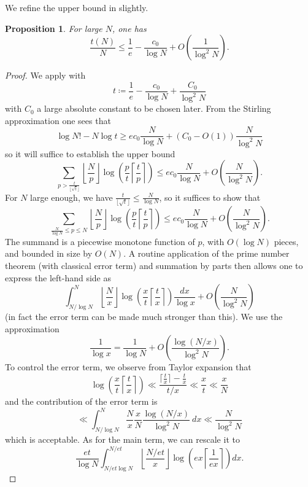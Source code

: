 \documentclass[12pt,a4paper,reqno]{amsart}
\numberwithin{equation}{section}
\theoremstyle{plain}
\newtheorem{proposition}[theorem]{Proposition}
\theoremstyle{definition}
\begin{document}
We refine the upper bound in \cite{tao} slightly.

\begin{proposition}\label{upper-bound}  For large $N$, one has
$$ \frac{t(N)}{N} \leq \frac{1}{e} - \frac{c_0}{\log N} + O\left( \frac{1}{\log^2 N} \right).$$
\end{proposition}

\begin{proof}  We apply  with
  $$ t \coloneqq \frac{1}{e} - \frac{c_0}{\log N} + \frac{C_0}{\log^2 N}$$
with $C_0$ a large absolute constant to be chosen later.  From the Stirling approximation one sees that
$$ \log N! - N \log t \geq ec_0 \frac{N}{\log N} + (C_0-O(1)) \frac{N}{\log^2 N}$$
so it will suffice to establish the upper bound
$$ \sum_{p > \frac{t}{\lfloor\sqrt{t}\rfloor}} \left\lfloor \frac{N}{p} \right\rfloor \log \left( \frac{p}{t} \left\lceil \frac{t}{p} \right\rceil \right) \leq ec_0 \frac{N}{\log N} + O\left( \frac{N}{\log^2 N} \right).$$
For $N$ large enough, we have $\frac{t}{\lfloor\sqrt{t}\rfloor} \leq \frac{N}{\log N}$, so it suffices to show that
$$ \sum_{\frac{N}{\log N} \leq p \leq N} \left\lfloor \frac{N}{p} \right\rfloor \log \left( \frac{p}{t} \left\lceil \frac{t}{p} \right\rceil \right) \leq ec_0 \frac{N}{\log N} + O\left( \frac{N}{\log^2 N} \right).$$
The summand is a piecewise monotone function of $p$, with $O(\log N)$ pieces, and bounded in size by $O(N)$.  A routine application of the prime number theorem (with classical error term) and summation by parts then allows one to express the left-hand side as
$$ \int_{N/\log N}^N \left\lfloor \frac{N}{x} \right\rfloor \log \left( \frac{x}{t} \left\lceil \frac{t}{x} \right\rceil \right) \frac{dx}{\log x} + O\left( \frac{N}{\log^2 N} \right)$$
(in fact the error term can be made much stronger than this). We use the approximation 
$$\frac{1}{\log x} = \frac{1}{\log N} + O\left( \frac{\log (N/x)}{\log^2 N} \right).$$ 
To control the error term, we observe from Taylor expansion that
\begin{equation}\label{tax} 
\log \left( \frac{x}{t} \left\lceil \frac{t}{x} \right\rceil \right)
\ll \frac{\lceil \frac{t}{x} \rceil - \frac{t}{x}}{t/x} \ll \frac{x}{t} \ll \frac{x}{N}
\end{equation}
and the contribution of the error term is
$$ \ll \int_{N/\log N}^N \frac{N}{x} \frac{x}{N} \frac{\log (N/x)}{\log^2 N}\ dx \ll \frac{N}{\log^2 N}$$
which is acceptable.  As for the main term, we can rescale it to
$$ \frac{et}{\log N} \int_{N/et\log N}^{N/et} \left\lfloor \frac{N/et}{x} \right\rfloor \log \left( ex \left\lceil \frac{1}{ex} \right\rceil \right) dx.$$

\end{proof}
\end{document}
